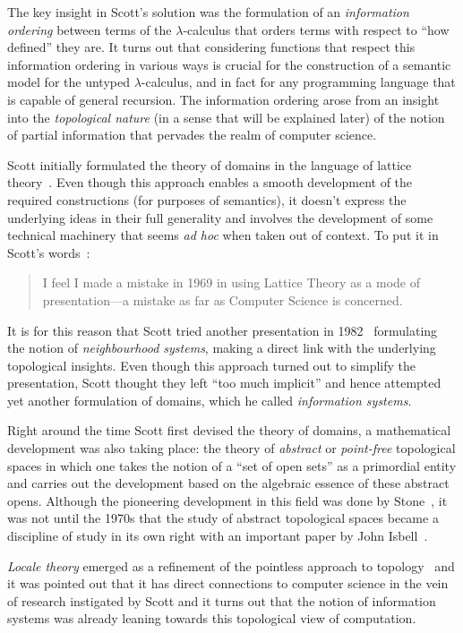\documentclass{article}
\begin{document}
The key insight in Scott's solution was the formulation of an \emph{information ordering}
between terms of the $\lambda$-calculus that orders terms with respect to ``how defined'' they
are. It turns out that considering functions that respect this information ordering in
various ways is crucial for the construction of a semantic model for the untyped
$\lambda$-calculus, and in fact for any programming language that is capable of general
recursion. The information ordering arose from an insight into the \emph{topological nature}
(in a sense that will be explained later) of the notion of partial information that
pervades the realm of computer science.

Scott initially formulated the theory of domains in the language of lattice
theory~\cite{birkhoff:1940}. Even though this approach enables a smooth development of the
required constructions (for purposes of semantics), it doesn't express the underlying
ideas in their full generality and involves the development of some technical machinery
that seems \emph{ad hoc} when taken out of context. To put it in Scott's
words~\cite[pg.~577]{scott:1982}:

\begin{quote}
  I feel I made a mistake in 1969 in using Lattice Theory as a mode of
  presentation---a mistake as far as Computer Science is concerned.
\end{quote}

It is for this reason that Scott tried another presentation in 1982~\cite{scott:1981}
formulating the notion of \emph{neighbourhood systems}, making a direct link with the
underlying topological insights. Even though this approach turned out to simplify the
presentation, Scott thought they left ``too much implicit'' and hence attempted yet
another formulation of domains, which he called \emph{information systems}.

Right around the time Scott first devised the theory of domains, a mathematical
development was also taking place: the theory of \emph{abstract} or \emph{point-free}
topological spaces in which one takes the notion of a ``set of open sets'' as a primordial
entity and carries out the development based on the algebraic essence of these abstract
opens. Although the pioneering development in this field was done by
Stone~\cite{stone:1934}, it was not until the 1970s that the study of abstract topological
spaces became a discipline of study in its own right with an important paper by John
Isbell~\cite{isbell:1973}.

\emph{Locale theory} emerged as a refinement of the pointless approach to topology~\cite{
johnstone:1982} and it was pointed out that it has direct connections to computer
science in the vein of research instigated by Scott and it turns out that the notion of
information systems was already leaning towards this topological view of computation.
\end{document}
